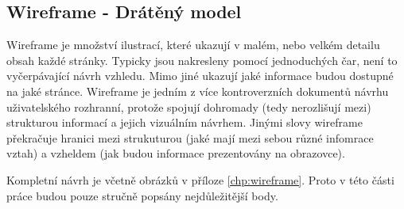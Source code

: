 \subsection{Wireframe - Drátěný model}
Wireframe je množství ilustrací, které ukazují v malém, nebo velkém detailu obsah každé stránky. Typicky jsou nakresleny pomocí jednoduchých čar, není to vyčerpávající návrh vzhledu. Mimo jiné ukazují jaké informace budou dostupné na jaké stránce. Wireframe je jedním z více kontroverzních dokumentů návrhu uživatelského rozhranní, protože spojují dohromady (tedy nerozlišují mezi) strukturou informací a jejich vizuálním návrhem. Jinými slovy wireframe překračuje hranici mezi strukuturou (jaké mají mezi sebou různé infomrace vztah) a vzheldem (jak budou informace prezentovány na obrazovce)\cite{brown2007communicating}.

Kompletní návrh je včetně obrázků v příloze \ref{chp:wireframe}. Proto v této části práce budou pouze stručně popsány nejdůležitější body.

